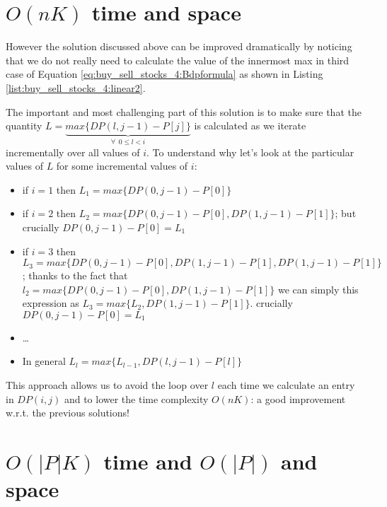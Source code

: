 

\section{$O(nK)$ time and space}
\label{buy_sell_stocks4:sec:linerartime1}
However the solution discussed above can be improved dramatically by noticing that we do not really need to calculate the value of the innermost max in third case of Equation \ref{eq:buy_sell_stocks_4:Bdpformula} as shown in Listing \ref{list:buy_sell_stocks_4:linear2}.



The important and most challenging part of this solution is to make sure that the quantity $L=\underbrace{max\big\{DP(l,j-1)-P[j]\big\}}_{\forall \: \: 0 \leq l < i}$ is calculated as we iterate incrementally over all values of $i$. 
To understand why let's look at the particular values of $L$ for some incremental values of $i$:
\begin{itemize}
	\item if $i=1$ then $L_1=max\big\{DP(0,j-1)-P[0]\big\}$
	\item if $i=2$ then $L_2=max\big\{DP(0,j-1)-P[0],DP(1,j-1)-P[1]\big\}$; but crucially $DP(0,j-1)-P[0] = L_1$
	\item if $i=3$ then $L_3=max\big\{DP(0,j-1)-P[0],DP(1,j-1)-P[1],DP(1,j-1)-P[1]\big\}$; thanks to the fact that $l_2 = max \{DP(0,j-1)-P[0],DP(1,j-1)-P[1]\}$ we can simply this expression as  $L_3=max\big\{L_2,DP(1,j-1)-P[1]\big\}$.
	 crucially $DP(0,j-1)-P[0] = L_1$
	 \item \ldots
	 \item In general $L_l = max\big\{L_{l-1}, DP(l,j-1)-P[l]\big\}$
\end{itemize}

This approach allows us to avoid the loop over $l$ each time we calculate an entry in $DP(i,j)$ and to lower the time complexity $O(nK)$: a good improvement w.r.t. the previous solutions!


\section{$O(|P|K)$ time  and $O(|P|)$ and space}


